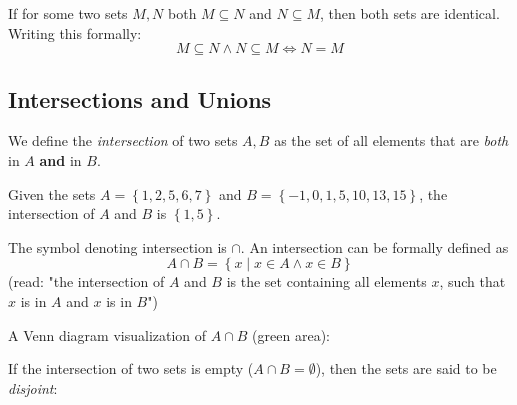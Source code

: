 If for some two sets $M,N$ both $M\subseteq N$ and $N\subseteq M$, then both sets are identical. Writing this formally:
\begin{equation*}
  M\subseteq N \wedge N\subseteq M \Leftrightarrow N=M
\end{equation*}

\subsection{Intersections and Unions}
We define the \emph{intersection} of two sets $A,B$ as the set of all elements that are \emph{both} in $A$ \textbf{and} in $B$.

\begin{example}
  Given the sets $A=\left\{ 1,2,5,6,7 \right\}$ and $B=\left\{ -1,0,1,5,10,13,15 \right\}$, the intersection of $A$ and $B$ is $\left\{ 1, 5 \right\}$.
\end{example}

The symbol denoting intersection is $\cap$. An intersection can be formally defined as
\begin{equation*}
  A\cap B = \left\{ x \mid x\in A \wedge x\in B \right\}
\end{equation*}
(read: "the intersection of $A$ and $B$ is the set containing all elements $x$, such that $x$ is in $A$ and $x$ is in $B$")

A Venn diagram visualization of $A\cap B$ (green area):
\begin{figure}[H]
  \centering
\end{figure}

If the intersection of two sets is empty ($A\cap B=\emptyset$), then the sets are said to be \emph{disjoint}:
\begin{figure}[H]
  \centering
\end{figure}

